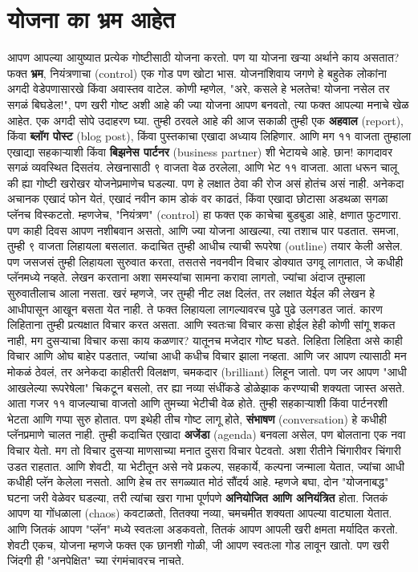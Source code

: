 \chapter{योजना का भ्रम आहेत}
आपण आपल्या आयुष्यात प्रत्येक गोष्टीसाठी योजना करतो. पण या योजना खऱ्या अर्थाने काय असतात? फक्त \textbf{भ्रम},  नियंत्रणाचा (control) एक गोड पण खोटा भास.
योजनांशिवाय जगणे हे बहुतेक लोकांना अगदी वेडेपणासारखे किंवा अवास्तव वाटेल. कोणी म्हणेल, "अरे, कसले हे भलतेच! योजना नसेल तर सगळं बिघडेल!",  पण खरी गोष्ट अशी आहे की ज्या योजना आपण बनवतो, त्या फक्त आपल्या मनाचे खेळ आहेत.
एक अगदी सोपे उदाहरण घ्या. तुम्ही ठरवले आहे की आज सकाळी तुम्ही एक \textbf{अहवाल} (report), किंवा \textbf{ब्लॉग पोस्ट} (blog post), किंवा पुस्तकाचा एखादा अध्याय लिहिणार. आणि मग ११ वाजता तुम्हाला एखाद्या सहकाऱ्याशी किंवा \textbf{बिझनेस पार्टनर} (business partner) शी भेटायचे आहे.
 छान! कागदावर सगळं व्यवस्थित दिसतंय. लेखनासाठी ९ वाजता वेळ ठरलेला, आणि भेट ११ वाजता.
आता धरून चालू की ह्या गोष्टी खरोखर योजनेप्रमाणेच घडल्या. पण हे लक्षात ठेवा की रोज असं होतंच असं नाही. अनेकदा अचानक एखादं फोन येतं, एखादं नवीन काम डोकं वर काढतं, किंवा एखादा छोटासा अडथळा सगळा प्लॅनच विस्कटतो. म्हणजेच, "नियंत्रण" (control) हा फक्त एक काचेचा बुडबुडा आहे,  क्षणात फुटणारा.
पण काही दिवस आपण नशीबवान असतो, आणि ज्या योजना आखल्या, त्या तशाच पार पडतात. समजा, तुम्ही ९ वाजता लिहायला बसलात. कदाचित तुम्ही आधीच त्याची रूपरेषा (outline) तयार केली असेल. पण जसजसं तुम्ही लिहायला सुरुवात करता, तसतसे नवनवीन विचार डोक्यात उगवू लागतात,  जे कधीही प्लॅनमध्ये नव्हते.
लेखन करताना अशा समस्यांचा सामना करावा लागतो, ज्यांचा अंदाज तुम्हाला सुरुवातीलाच आला नसता. खरं म्हणजे, जर तुम्ही नीट लक्ष दिलंत, तर लक्षात येईल की लेखन हे आधीपासून आखून बसता येत नाही. ते फक्त लिहायला लागल्यावरच पुढे पुढे उलगडत जातं. कारण लिहिताना तुम्ही प्रत्यक्षात विचार करत असता. आणि स्वतःचा विचार कसा होईल हेही कोणी सांगू शकत नाही,  मग दुसऱ्याचा विचार कसा काय कळणार?
यातूनच मजेदार गोष्ट घडते. लिहिता लिहिता असे काही विचार आणि ओघ बाहेर पडतात, ज्यांचा आधी कधीच विचार झाला नव्हता. आणि जर आपण त्यासाठी मन मोकळं ठेवलं, तर अनेकदा काहीतरी विलक्षण, चमकदार (brilliant) लिहून जातो. पण जर आपण "आधी आखलेल्या रूपरेषेला" चिकटून बसलो, तर ह्या नव्या संधींकडे डोळेझाक करण्याची शक्यता जास्त असते.
आता गजर ११ वाजल्याचा वाजतो आणि तुमच्या भेटीची वेळ होते. तुम्ही सहकाऱ्याशी किंवा पार्टनरशी भेटता आणि गप्पा सुरु होतात.
 पण इथेही तीच गोष्ट लागू होते,  \textbf{संभाषण} (conversation) हे कधीही प्लॅनप्रमाणे चालत नाही. तुम्ही कदाचित एखादा \textbf{अजेंडा} (agenda) बनवला असेल, पण बोलताना एक नवा विचार येतो. मग तो विचार दुसऱ्या माणसाच्या मनात दुसरा विचार पेटवतो. अशा रीतीने चिंगारीवर चिंगारी उडत राहतात.
 आणि शेवटी, या भेटीतून असे नवे प्रकल्प, सहकार्ये, कल्पना जन्माला येतात, ज्यांचा आधी कधीही प्लॅन केलेला नसतो. आणि हेच तर सगळ्यात मोठं सौंदर्य आहे.
म्हणजे बघा, दोन "योजनाबद्ध" घटना जरी वेळेवर घडल्या, तरी त्यांचा खरा गाभा पूर्णपणे \textbf{अनियोजित आणि अनियंत्रित} होता.
 जितकं आपण या गोंधळाला (chaos) कवटाळतो, तितक्या नव्या, चमचमीत शक्यता आपल्या वाट्याला येतात. आणि जितकं आपण "प्लॅन" मध्ये स्वतःला अडकवतो, तितकं आपण आपली खरी क्षमता मर्यादित करतो.
शेवटी एकच,  योजना म्हणजे फक्त एक छानशी गोळी, जी आपण स्वतःला गोड लावून खातो. पण खरी जिंदगी ही "अनपेक्षित" च्या रंगमंचावरच नाचते.


